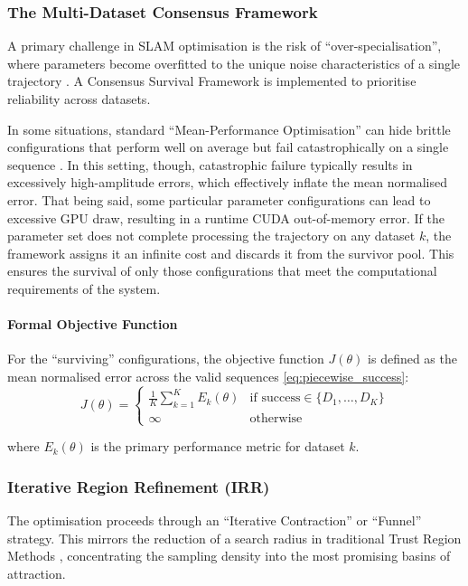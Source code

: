 \subsubsection{The Multi-Dataset Consensus Framework}
A primary challenge in SLAM optimisation is the risk of ``over-specialisation'', where parameters become overfitted to the unique noise characteristics of a single trajectory \cite{limAdaLIORobustAdaptive2023}. A Consensus Survival Framework is implemented to prioritise reliability across datasets.

In some situations, standard ``Mean-Performance Optimisation'' can hide brittle configurations that perform well on average but fail catastrophically on a single sequence \cite{robeyProbabilisticallyRobustLearning2022}. In this setting, though, catastrophic failure typically results in excessively high-amplitude errors, which effectively inflate the mean normalised error. That being said, some particular parameter configurations can lead to excessive GPU draw, resulting in a runtime CUDA out-of-memory error. If the parameter set does not complete processing the trajectory on any dataset $k$, the framework assigns it an infinite cost and discards it from the survivor pool. This ensures the survival of only those configurations that meet the computational requirements of the system.

\paragraph{Formal Objective Function}
For the ``surviving'' configurations, the objective function $J(\theta)$ is defined as the mean normalised error across the valid sequences \eqref{eq:piecewise_success}:
\begin{equation}
\label{eq:piecewise_success}
J(\theta) = 
\begin{cases} 
\frac{1}{K} \sum_{k=1}^K E_k(\theta) & \text{if success} \in \{D_1, \dots, D_K\} \\ 
\infty & \text{otherwise} 
\end{cases}
\end{equation}

where $E_k(\theta)$ is the primary performance metric for dataset $k$.

\subsubsection{Iterative Region Refinement (IRR)}
The optimisation proceeds through an ``Iterative Contraction'' or ``Funnel'' strategy. This mirrors the reduction of a search radius in traditional Trust Region Methods \cite{nocedalTrustRegionMethods2006}, concentrating the sampling density into the most promising basins of attraction.

